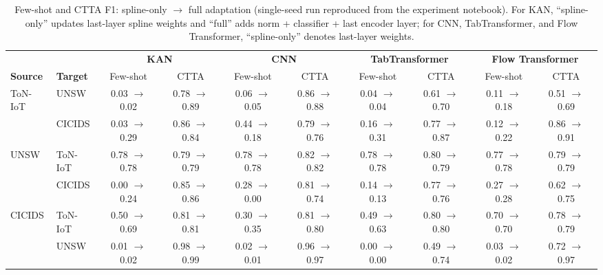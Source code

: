 \documentclass[10pt, conference, letterpaper]{IEEEtran}
\begin{document}
\begin{table}[t]
\centering
\caption{Few-shot and CTTA F1: spline-only $\rightarrow$ full adaptation (single-seed run reproduced from the experiment notebook). For KAN, ``spline-only'' updates last-layer spline weights and ``full'' adds norm + classifier + last encoder layer; for CNN, TabTransformer, and Flow Transformer, ``spline-only'' denotes last-layer weights.}
\label{tab:fewshot_ctta_comparison}
\setlength{\tabcolsep}{4pt}
\begin{tabular}{l|l|cc|cc|cc|cc}
\toprule
 & & \multicolumn{2}{c|}{\textbf{KAN}} & \multicolumn{2}{c|}{\textbf{CNN}} & \multicolumn{2}{c|}{\textbf{TabTransformer}} & \multicolumn{2}{c}{\textbf{Flow Transformer}} \\
\textbf{Source} & \textbf{Target} & Few-shot & CTTA & Few-shot & CTTA & Few-shot & CTTA & Few-shot & CTTA \\
\midrule
\multirow{2}{*}{ToN-IoT}
    & UNSW    & 0.03 $\rightarrow$ 0.02 & 0.78 $\rightarrow$ 0.89 & 0.06 $\rightarrow$ 0.05 & 0.86 $\rightarrow$ 0.88 & 0.04 $\rightarrow$ 0.04 & 0.61 $\rightarrow$ 0.70 & 0.11 $\rightarrow$ 0.18 & 0.51 $\rightarrow$ 0.69 \\
    & CICIDS  & 0.03 $\rightarrow$ 0.29 & 0.86 $\rightarrow$ 0.84 & 0.44 $\rightarrow$ 0.18 & 0.79 $\rightarrow$ 0.76 & 0.16 $\rightarrow$ 0.31 & 0.77 $\rightarrow$ 0.87 & 0.12 $\rightarrow$ 0.22 & 0.86 $\rightarrow$ 0.91 \\
\midrule
\multirow{2}{*}{UNSW}
    & ToN-IoT & 0.78 $\rightarrow$ 0.78 & 0.79 $\rightarrow$ 0.79 & 0.78 $\rightarrow$ 0.78 & 0.82 $\rightarrow$ 0.82 & 0.78 $\rightarrow$ 0.78 & 0.80 $\rightarrow$ 0.79 & 0.77 $\rightarrow$ 0.78 & 0.79 $\rightarrow$ 0.79 \\
    & CICIDS  & 0.00 $\rightarrow$ 0.24 & 0.85 $\rightarrow$ 0.86 & 0.28 $\rightarrow$ 0.00 & 0.81 $\rightarrow$ 0.74 & 0.14 $\rightarrow$ 0.13 & 0.77 $\rightarrow$ 0.76 & 0.27 $\rightarrow$ 0.28 & 0.62 $\rightarrow$ 0.75 \\
\midrule
\multirow{2}{*}{CICIDS}
    & ToN-IoT & 0.50 $\rightarrow$ 0.69 & 0.81 $\rightarrow$ 0.81 & 0.30 $\rightarrow$ 0.35 & 0.81 $\rightarrow$ 0.80 & 0.49 $\rightarrow$ 0.63 & 0.80 $\rightarrow$ 0.80 & 0.70 $\rightarrow$ 0.70 & 0.78 $\rightarrow$ 0.79 \\
    & UNSW    & 0.01 $\rightarrow$ 0.02 & 0.98 $\rightarrow$ 0.99 & 0.02 $\rightarrow$ 0.01 & 0.96 $\rightarrow$ 0.97 & 0.00 $\rightarrow$ 0.00 & 0.49 $\rightarrow$ 0.74 & 0.03 $\rightarrow$ 0.02 & 0.72 $\rightarrow$ 0.97 \\
\bottomrule
\end{tabular}
\end{table}
\end{document}
